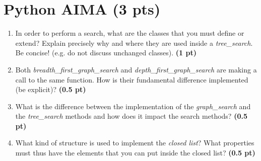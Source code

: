 \documentclass[11pt,a4paper]{report}
\begin{document}
\maketitle

\section{Python AIMA (3 pts)}

\begin{enumerate}
  \item In order to perform a search, what are the classes that you must define or extend? Explain precisely why and where they are used inside a \textit{tree\_search}. Be concise! (e.g. do not discuss unchanged classes). \textbf{(1 pt)}
\end{enumerate}

\begin{answer}
\end{answer}



\begin{enumerate}
\setcounter{enumi}{1}
    \item Both \textit{breadth\_first\_graph\_search} and \textit{depth\_first\_graph\_search} are making a call to the same function. How is their fundamental difference implemented (be explicit)? \textbf{(0.5 pt)}
\end{enumerate}

\begin{answer}
\end{answer}



\begin{enumerate}
\setcounter{enumi}{2}
    \item What is the difference between the implementation of the \textit{graph\_search} and the \textit{tree\_search} methods and how does it impact the search methods? \textbf{(0.5 pt)}
\end{enumerate}

\begin{answer}
\end{answer}



\begin{enumerate}
\setcounter{enumi}{3}
    \item What kind of structure is used to implement the \textit{closed list}? What properties must thus have the elements that you can
	put inside the closed list? \textbf{(0.5 pt)}
\end{enumerate}
\end{document}
